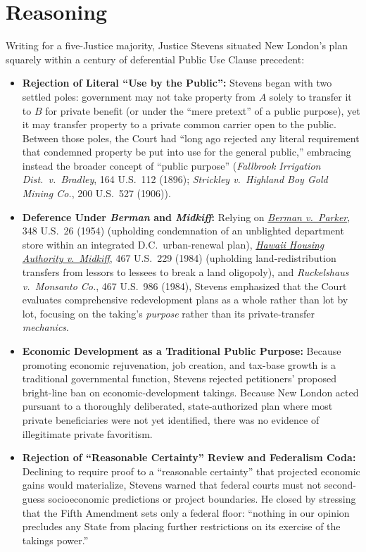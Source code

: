 \documentclass[12pt]{article}
\begin{document}
\section{Reasoning}
Writing for a five-Justice majority, Justice Stevens situated New London's plan squarely within a century of deferential Public Use Clause precedent:

\begin{itemize}
  \item \textbf{Rejection of Literal ``Use by the Public'':} Stevens began with two settled poles: government may not take property from $A$ solely to transfer it to $B$ for private benefit (or under the ``mere pretext'' of a public purpose), yet it may transfer property to a private common carrier open to the public. Between those poles, the Court had ``long ago rejected any literal requirement that condemned property be put into use for the general public,'' embracing instead the broader concept of ``public purpose'' (\textit{Fallbrook Irrigation Dist.\ v.\ Bradley}, 164 U.S.\ 112 (1896); \textit{Strickley v.\ Highland Boy Gold Mining Co.}, 200 U.S.\ 527 (1906)).
  \item \textbf{Deference Under \textit{Berman} and \textit{Midkiff}:} Relying on \href{https://supreme.justia.com/cases/federal/us/348/26/}{\textit{Berman v.\ Parker}}, 348 U.S.\ 26 (1954) (upholding condemnation of an unblighted department store within an integrated D.C.\ urban-renewal plan), \href{https://supreme.justia.com/cases/federal/us/467/229/}{\textit{Hawaii Housing Authority v.\ Midkiff}}, 467 U.S.\ 229 (1984) (upholding land-redistribution transfers from lessors to lessees to break a land oligopoly), and \textit{Ruckelshaus v.\ Monsanto Co.}, 467 U.S.\ 986 (1984), Stevens emphasized that the Court evaluates comprehensive redevelopment plans as a whole rather than lot by lot, focusing on the taking's \textit{purpose} rather than its private-transfer \textit{mechanics}.
  \item \textbf{Economic Development as a Traditional Public Purpose:} Because promoting economic rejuvenation, job creation, and tax-base growth is a traditional governmental function, Stevens rejected petitioners' proposed bright-line ban on economic-development takings. Because New London acted pursuant to a thoroughly deliberated, state-authorized plan where most private beneficiaries were not yet identified, there was no evidence of illegitimate private favoritism.
  \item \textbf{Rejection of ``Reasonable Certainty'' Review and Federalism Coda:} Declining to require proof to a ``reasonable certainty'' that projected economic gains would materialize, Stevens warned that federal courts must not second-guess socioeconomic predictions or project boundaries. He closed by stressing that the Fifth Amendment sets only a federal floor: ``nothing in our opinion precludes any State from placing further restrictions on its exercise of the takings power.''
\end{itemize}
\end{document}
